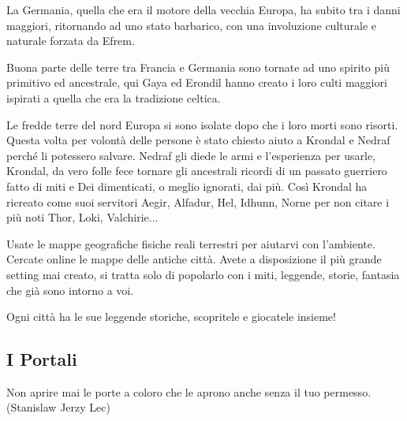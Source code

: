 \begin{multicols}{2}
La Germania, quella che era il motore della vecchia Europa, ha subito tra i danni maggiori, ritornando ad uno stato barbarico, con una involuzione culturale e naturale forzata da Efrem.

Buona parte delle terre tra Francia e Germania sono tornate ad uno spirito più primitivo ed ancestrale, qui Gaya ed Erondil hanno creato i loro culti maggiori ispirati a quella che era la tradizione celtica.

Le fredde terre del nord Europa si sono isolate dopo che i loro morti sono risorti. Questa volta per volontà delle persone è stato chiesto aiuto a Krondal e Nedraf perché li potessero salvare. Nedraf gli diede le armi e l'esperienza per usarle, Krondal, da vero folle fece tornare gli ancestrali ricordi di un passato guerriero fatto di miti e Dei dimenticati, o meglio ignorati, dai più.
Così Krondal ha ricreato come suoi servitori Aegir, Alfadur, Hel, Idhunn, Norne per non citare i più noti Thor, Loki, Valchirie...

\begin{narratore}
Usate le mappe geografiche fisiche reali terrestri per aiutarvi con l'ambiente. Cercate online le mappe delle antiche città. Avete a disposizione il più grande setting mai creato, si tratta solo di popolarlo con i miti, leggende, storie, fantasia che già sono intorno a voi.

Ogni città ha le sue leggende storiche, scopritele e giocatele insieme!
\end{narratore}

\end{multicols}

\subsection{I Portali}

\begin{enfasi}{
Non aprire mai le porte a coloro che le aprono anche senza il tuo permesso. (Stanislaw Jerzy Lec)}\end{enfasi}

